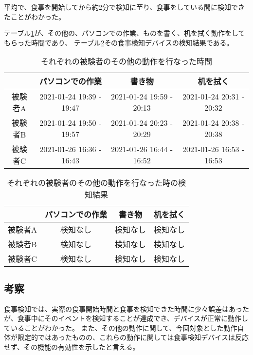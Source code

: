 平均で、食事を開始してから約2分で検知に至り、食事をしている間に検知できたことがわかった。

テーブル\ref{tb:others_detection_time}が、その他の、パソコンでの作業、ものを書く、机を拭く動作をしてもらった時間であり、
テーブル\ref{tb:others_detection_result}その食事検知デバイスの検知結果である。

\begin{table}[htbp]
  \caption{それぞれの被験者のその他の動作を行なった時間}
  \label{tb:others_detection_time}
  \begin{center}
    \begin{tabular}{|c||c|c|c|}
      \hline
       & パソコンでの作業 & 書き物 & 机を拭く \\
      \hline\hline
      被験者A & 2021-01-24 19:39 - 19:47 & 2021-01-24 19:59 - 20:13 & 2021-01-24 20:31 - 20:32 \\\hline
      被験者B & 2021-01-24 19:50 - 19:57 & 2021-01-24 20:23 - 20:29 & 2021-01-24 20:38 - 20:38  \\\hline
      被験者C & 2021-01-26 16:36 - 16:43 & 2021-01-26 16:44 - 16:52 & 2021-01-26 16:53 - 16:53 \\\hline
    \end{tabular}
  \end{center}
\end{table}

\begin{table}[htbp]
  \caption{それぞれの被験者のその他の動作を行なった時の検知結果}
  \label{tb:others_detection_result}
  \begin{center}
    \begin{tabular}{|c||c|c|c|}
      \hline
       & パソコンでの作業 & 書き物 & 机を拭く \\
      \hline\hline
      被験者A & 検知なし & 検知なし & 検知なし \\\hline
      被験者B & 検知なし & 検知なし & 検知なし \\\hline
      被験者C & 検知なし & 検知なし & 検知なし \\\hline
    \end{tabular}
  \end{center}
\end{table}

\subsection{考察}

食事検知では、実際の食事開始時間と食事を検知できた時間に少々誤差はあったが、食事中にそのイベントを検知することが達成でき、デバイスが正常に動作していることがわかった。
また、その他の動作に関して、今回対象とした動作自体が限定的ではあったものの、これらの動作に関しては食事検知デバイスは反応せず、その機能の有効性を示したと言える。

